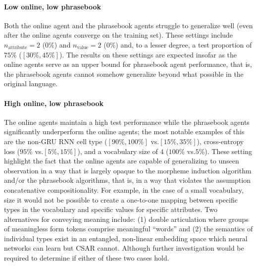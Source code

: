 \paragraph{Low online, low phrasebook}
Both the online agent and the phrasebook agents struggle to generalize well (even after the online agents converge on the training set).
These settings include $n_\text{attribute}=2$ ($0\%$)  and $n_\text{value}=2$ ($0\%$) and, to a lesser degree, a test proportion of $75\%$ ($[30\%,45\%]$).
The results on these settings are expected insofar as the online agents serve as an upper bound for phrasebook agent performance, that is, the phrasebook agents cannot somehow generalize beyond what possible in the original language.

\paragraph{High online, low phrasebook}
The online agents maintain a high test performance while the phrasebook agents significantly underperform the online agents;
  the most notable examples of this are the non-GRU RNN cell type ($[90\%,100\%]$ vs.\@ $[15\%,35\%]$), cross-entropy loss ($95\%$ vs.\@ $[5\%,15\%]$), and a vocabulary size of $4$ ($100\%$ vs.\@ $5\%$).
These setting highlight the fact that the online agents are capable of generalizing to unseen observation in a way that is largely opaque to the morpheme induction algorithm and/or the phrasebook algorithms, that is, in a way that violates the assumption concatenative compositionality.
For example, in the case of a small vocabulary, size it would not be possible to create a one-to-one mapping between specific types in the vocabulary and specific values for specific attributes.
Two alternatives for conveying meaning include:
  (1) double articulation where groups of meaningless form tokens comprise meaningful ``words''
  and (2) the semantics of individual types exist in an entangled, non-linear embedding space which neural networks can learn but CSAR cannot.
Although further investigation would be required to determine if either of these two cases hold.
